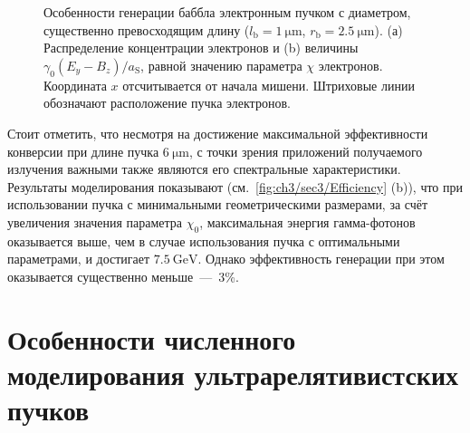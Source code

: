 \begin{figure}[ht]
    \caption[Особенности генерации баббла электронным пучком с диаметром, существенно превосходящим длину]{Особенности генерации баббла электронным пучком с диаметром, существенно превосходящим длину ($l_\mathrm{b} = \SI{1}{\um}$, $r_\mathrm{b} = \SI{2.5}{\um}$). (а) Распределение концентрации электронов и (b) величины $\gamma_0 \left( E_y - B_z \right) / a_\mathrm{S}$, равной значению параметра $\chi$ электронов.
    Координата $x$ отсчитывается от начала мишени.
    Штриховые линии обозначают расположение пучка электронов.}
    \label{fig:ch3/sec3/Pancake}
\end{figure}

Стоит отметить, что несмотря на достижение максимальной эффективности конверсии при длине пучка $\SI{6}{\um}$, с точки зрения приложений получаемого излучения важными также являются его спектральные характеристики.
Результаты моделирования показывают (см.~\ref{fig:ch3/sec3/Efficiency} (b)), что при использовании пучка с минимальными геометрическими размерами, за счёт увеличения значения параметра $\chi_0$, максимальная энергия гамма-фотонов оказывается выше, чем в случае использования пучка с оптимальными параметрами, и достигает $\SI{7.5}{\giga\electronvolt}$.
Однако эффективность генерации при этом оказывается существенно меньше~---~3\%.

\section{Особенности численного моделирования ультрарелятивистских пучков}
\label{sec:ch3/sec4}

